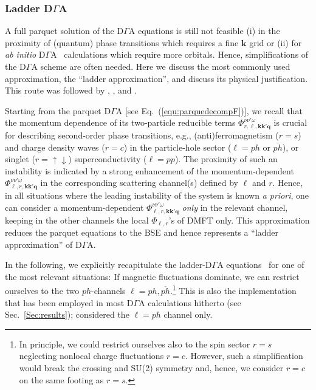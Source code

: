 \documentclass[rmp,aps,reprint,amsmath,amssymb,superscriptaddress,showpacs,nofootinbib]{revtex4-1}
\begin{document}
\subsubsection{Ladder D\texorpdfstring{$\Gamma$}{G}A}
\label{sec:dgaladder}

A full parquet solution of the D$\Gamma$A equations is still not feasible (i) in the proximity of (quantum) phase transitions which requires a fine $\mathbf k$ grid or (ii) for {\em ab initio}  D$\Gamma$A~\cite{Toschi2011,Galler2016} calculations which require more orbitals. Hence, simplifications of the D$\Gamma$A scheme are often needed. Here we discuss the most commonly used approximation, the ``ladder approximation'', and discuss its physical justification. This route was followed by , , and .

Starting from the parquet D$\Gamma$A [see Eq.~(\ref{equ:parquedecompF})], we recall that the momentum dependence of its two-particle reducible terms $\Phi_{r,\ell,\mathbf{k}\mathbf{k}'\mathbf{q}}^{\nu\nu'\omega}$ is crucial for describing second-order phase transitions, e.g., (anti)ferromagnetism ($r\!=\!s$) and charge density waves ($r\!=\!c$) in the particle-hole sector ($\ell\!=\!ph$ or $\overline{ph}$), or singlet ($r=\uparrow\downarrow$) superconductivity ($\ell\!=\!pp$). The proximity of such an instability is indicated by a strong enhancement of the momentum-dependent  $\Phi_{\ell,r,\mathbf{k}\mathbf{k}'\mathbf{q}}^{\nu\nu'\omega}$ in the corresponding scattering channel(s) defined by $\ell$ and $r$.  Hence, in all situations where the leading instability of the system is known {\sl a priori}, one can consider a momentum-dependent $\Phi_{\ell,r,\mathbf{k}\mathbf{k}'\mathbf{q}}^{\nu\nu'\omega}$ {\sl only} in the relevant channel, keeping in the other channels the  local $\Phi_{\ell,r}$'s of DMFT only. This approximation reduces the parquet equations to the BSE and hence represents a ``ladder approximation'' of D$\Gamma$A.

In the following, we explicitly recapitulate the ladder-D$\Gamma$A equations~\cite{Toschi2007,Rohringer2013a} for one of the most relevant situations: If magnetic fluctuations dominate, we can restrict ourselves to the two $ph$-channels $\ell=ph,\overline{ph}$.\footnote{In principle, we could restrict ourselves also to the spin sector $r\!=\!s$ neglecting nonlocal charge fluctuations $r\!=\!c$. However, such a simplification would break the crossing and SU(2) symmetry and, hence, we consider $r\!=\!c$ on the same footing as $r\!=\!s$.} This is also the  implementation that has been employed in most D$\Gamma$A calculations hitherto (see Sec.~\ref{Sec:results});  considered the  $\ell=ph$ channel only.
\end{document}
